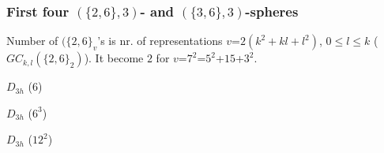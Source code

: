\documentclass{beamer}
\begin{document}
\begin{frame}\frametitle{First four $(\{2,6\},3)$- and
$(\{3,6\},3)$-spheres}
\vspace{-1.5mm}
 Number  of $(\{2,6\}_v$'s is nr. of representations $v$=$2(k^2+kl+l^2)$,  
$0\le l\le k$ ($GC_{k,l}(\{2,6\}_2)$). It become $2$ for 
$v$=$7^2$=$5^2$+$15$+$3^2$.

\begin{center}
\begin{minipage}[b]{25mm}
\centering
{}\par
$D_{3h}$ ($6$)
\end{minipage}
\begin{minipage}[b]{23mm}
\centering
{}\par
$D_{3h}$ ($6^3$)
\end{minipage}
\begin{minipage}[b]{18mm}
\centering
{}\par
$D_{3h}$  ($12^2$)
\end{minipage}
\begin{minipage}[b]{28mm}

\end{minipage}
\end{center}
\end{frame}
\end{document}
